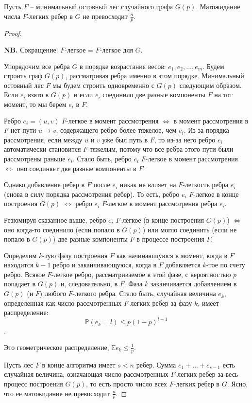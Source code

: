 \begin{theorem*}
    Пусть $F$ -- минимальный остовный лес случайного графа $G(p)$. Матожидание числа $F$-легких ребер в $G$ не превосходит $\frac{n}{p}$.
\end{theorem*}
\begin{proof}
    $ $

    \textbf{NB. } Сокращение: $F$-легкое = $F$-легкое для $G$.

    Упорядочим все ребра $G$ в порядке возрастания весов: $e_1, e_2, \ldots, e_m$. Будем строить граф $G(p)$, рассматривая ребра именно в этом порядке. Минимальный остовный лес $F$ мы будем строить одновременно с $G(p)$ следующим образом. Если $e_i$ взято в $G(p)$ и если $e_i$ соединило две разные компоненты $F$ на тот момент, то мы берем $e_i$ в $F$.

    Ребро $e_i = (u,v)$ $F$-легкое в момент рассмотрения $\iff$ в момент рассмотрения в $F$ нет пути $u \rightarrow v$, содержащего ребро более тяжелое, чем $e_i$. Из-за порядка рассмотрения, если между $u$ и $v$ уже был путь в $F$, то из-за него ребро $e_i$ автоматически становится $F$-тяжелым, потому что все ребра этого пути были рассмотрены раньше $e_i$. Стало быть, ребро $e_i$ $F$-легкое в момент рассмотрения $\iff$ оно соединяет две разные компоненты в $F$.

    Однако добавление ребер в $F$ после $e_i$ никак не влияет на $F$-легкость ребра $e_i$ (снова в силу порядка рассмотрения ребер). То есть, ребро $e_i$ $F$-легкое в конце построения $G(p)$ $\iff$ ребро $e_i$ $F$-легкое в момент рассмотрения ребра $e_i$.

    Резюмируя сказанное выше, ребро $e_i$ $F$-легкое (в конце построения $G(p)$) $\iff$ оно когда-то соединило (если попало в $G(p)$) или могло соединить (если не попало в $G(p)$) две разные компоненты $F$ в процессе построения $F$.

    Определим $k$-тую фазу построения $F$ как начинающуюся в момент, когда в $F$ находится $k-1$ ребро и заканчивающуюся, когда в $F$ добавляется $k$-тое по счету ребро. Всякое $F$-легкое ребро, рассматриваемое в этой фазе, с вероятностью $p$ попадает в $G(p)$ и, следовательно, в $F$. Фаза $k$ заканчивается добавлением в $G(p)$ (и $F$) любого $F$-легкого ребра. Стало быть, случайная величина $e_k$, определенная как число рассмотренных $F$-легких ребер за фазу $k$, имеет распределение: $$\mathbb P(e_k = l) \leq  p(1-p)^{l-1}$$.

    Это геометрическое распределение, $\mathbb E e_k \leq \frac{1}{p}$.

    Пусть лес $F$ в конце алгоритма имеет $s < n$ ребер. Сумма $e_1 + ... + e_{s-1}$ есть случайная величина, означающая число рассмотренных $F$-легких ребер за весь процесс построения $G(p)$, то есть просто число всех $F$-легких ребер в $G$. Ясно, что ее матожидание не превосходит $\frac{n}{p}$.

\end{proof}

